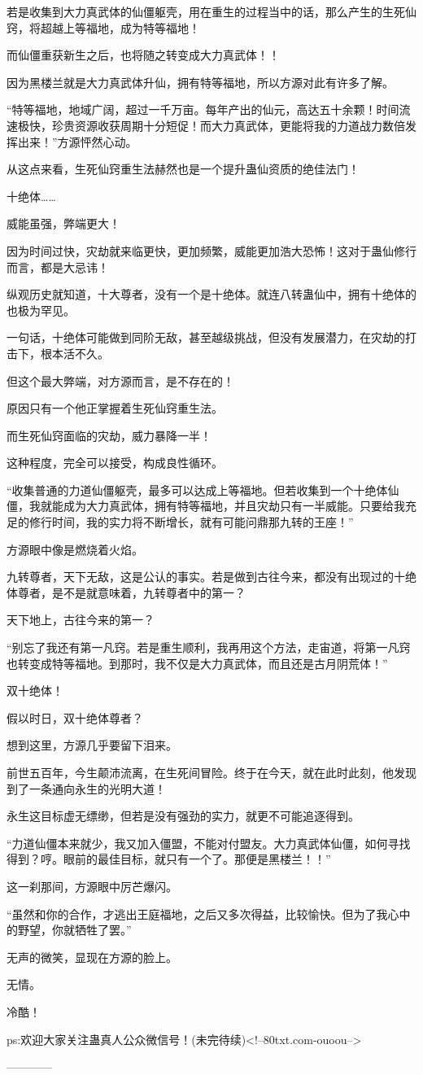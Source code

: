 \begin{this_body}
若是收集到大力真武体的仙僵躯壳，用在重生的过程当中的话，那么产生的生死仙窍，将超越上等福地，成为特等福地！

而仙僵重获新生之后，也将随之转变成大力真武体！！

因为黑楼兰就是大力真武体升仙，拥有特等福地，所以方源对此有许多了解。

“特等福地，地域广阔，超过一千万亩。每年产出的仙元，高达五十余颗！时间流速极快，珍贵资源收获周期十分短促！而大力真武体，更能将我的力道战力数倍发挥出来！”方源怦然心动。

从这点来看，生死仙窍重生法赫然也是一个提升蛊仙资质的绝佳法门！

十绝体……

威能虽强，弊端更大！

因为时间过快，灾劫就来临更快，更加频繁，威能更加浩大恐怖！这对于蛊仙修行而言，都是大忌讳！

纵观历史就知道，十大尊者，没有一个是十绝体。就连八转蛊仙中，拥有十绝体的也极为罕见。

一句话，十绝体可能做到同阶无敌，甚至越级挑战，但没有发展潜力，在灾劫的打击下，根本活不久。

但这个最大弊端，对方源而言，是不存在的！

原因只有一个他正掌握着生死仙窍重生法。

而生死仙窍面临的灾劫，威力暴降一半！

这种程度，完全可以接受，构成良性循环。

“收集普通的力道仙僵躯壳，最多可以达成上等福地。但若收集到一个十绝体仙僵，我就能成为大力真武体，拥有特等福地，并且灾劫只有一半威能。只要给我充足的修行时间，我的实力将不断增长，就有可能问鼎那九转的王座！”

方源眼中像是燃烧着火焰。

九转尊者，天下无敌，这是公认的事实。若是做到古往今来，都没有出现过的十绝体尊者，是不是就意味着，九转尊者中的第一？

天下地上，古往今来的第一？

“别忘了我还有第一凡窍。若是重生顺利，我再用这个方法，走宙道，将第一凡窍也转变成特等福地。到那时，我不仅是大力真武体，而且还是古月阴荒体！”

双十绝体！

假以时日，双十绝体尊者？

想到这里，方源几乎要留下泪来。

前世五百年，今生颠沛流离，在生死间冒险。终于在今天，就在此时此刻，他发现到了一条通向永生的光明大道！

永生这目标虚无缥缈，但若是没有强劲的实力，就更不可能追逐得到。

“力道仙僵本来就少，我又加入僵盟，不能对付盟友。大力真武体仙僵，如何寻找得到？哼。眼前的最佳目标，就只有一个了。那便是黑楼兰！！”

这一刹那间，方源眼中厉芒爆闪。

“虽然和你的合作，才逃出王庭福地，之后又多次得益，比较愉快。但为了我心中的野望，你就牺牲了罢。”

无声的微笑，显现在方源的脸上。

无情。

冷酷！

ps:欢迎大家关注蛊真人公众微信号！(未完待续)<!--80txt.com-ouoou-->

------------

\end{this_body}

